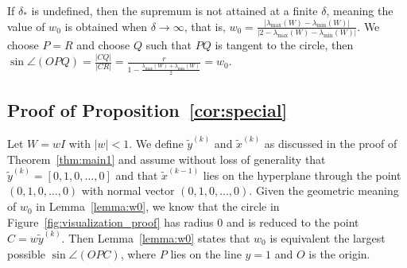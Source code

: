 \documentclass[11pt]{article}
\begin{document}
{If $\delta_*$ is undefined, then the supremum is not attained at a finite $\delta$, meaning the value of $w_0$ is obtained when  $\delta\rightarrow\infty$, that is,  
$w_0=\frac{|\lambda_{\max}(W)-\lambda_{\min}(W)|}{|2\!-\!\lambda_{\max}(\!W\!)\!-\!\lambda_{\min}(W\!)|}$. We choose $P=R$ and choose $Q$ such that $PQ$ is tangent to the circle, then $\sin\angle(OPQ)=\frac{|CQ|}{|CR|}=\frac{r}{1-\frac{\lambda_{\max}(W)+\lambda_{\min}(W)}{2}}=w_0$.

\subsection{Proof of Proposition~\ref{cor:special}} Let $W = w{I}$ with $|w|<1$. We define $\widetilde{y}^{(k)}$ and $\widetilde{x}^{(k)}$ as discussed in the proof of Theorem~\ref{thm:main1} and assume without loss of generality that $\widetilde{y}^{(k)} = [0,1,0,\hdots,0]$ and that $\widetilde{x}^{(k-1)}$ lies on the hyperplane through the point $(0,1,0,\hdots,0)$ with normal vector $(0,1,0,\hdots,0)$. Given the geometric meaning of $w_0$ in Lemma~\ref{lemma:w0}, we know that the circle in Figure~\ref{fig:visualization_proof} has radius $0$ and is reduced to the  point $C=w \widetilde{y}^{(k)}$. Then Lemma~\ref{lemma:w0} states that  $w_0$ is equivalent the largest possible $\sin\angle(OPC)$, where $P$ lies on the line $y=1$ and $O$ is the origin. 

}
\end{document}
